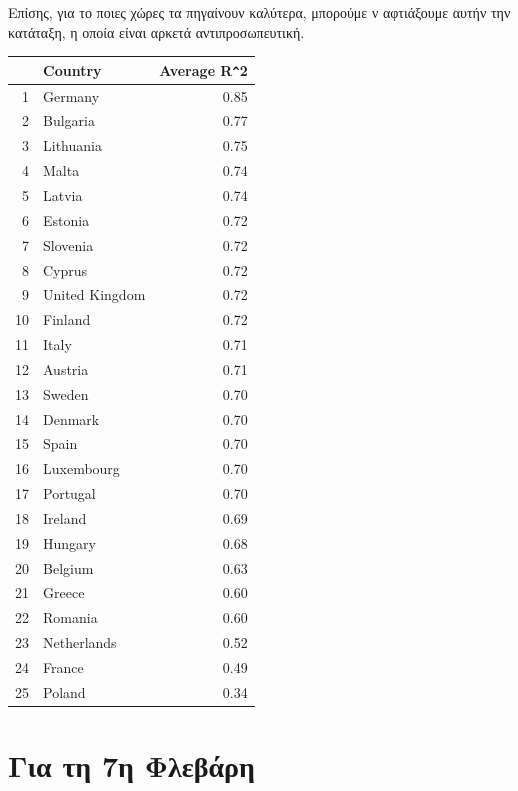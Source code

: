\documentclass[a4paper,twoside,10pt]{article}
\begin{document}
	Επίσης, για το ποιες χώρες τα πηγαίνουν καλύτερα, μπορούμε ν αφτιάξουμε αυτήν την κατάταξη, η οποία είναι αρκετά αντιπροσωπευτική.
	\begin{table}[H]
		\centering
		\begin{tabular}{rlr}
			\hline
			& Country & Average R\verb|^|2 \\
			\hline
			1 & Germany & 0.85 \\
			2 & Bulgaria & 0.77 \\
			3 & Lithuania & 0.75 \\
			4 & Malta & 0.74 \\
			5 & Latvia & 0.74 \\ 
			6 & Estonia & 0.72 \\
			7 & Slovenia & 0.72 \\
			8 & Cyprus & 0.72 \\
			9 & United Kingdom & 0.72 \\
			10 & Finland & 0.72 \\
			11 & Italy & 0.71 \\
			12 & Austria & 0.71 \\
			13 & Sweden & 0.70 \\ 
			14 & Denmark & 0.70 \\
			15 & Spain & 0.70 \\
			16 & Luxembourg & 0.70 \\
			17 & Portugal & 0.70 \\
			18 & Ireland & 0.69 \\
			19 & Hungary & 0.68 \\
			20 & Belgium & 0.63 \\
			21 & Greece & 0.60 \\
			22 & Romania & 0.60 \\
			23 & Netherlands & 0.52 \\
			24 & France & 0.49 \\ 
			25 & Poland & 0.34 \\
			\hline
		\end{tabular}
	\end{table}

	\newpage
	\section{Για τη 7η Φλεβάρη}
	
\end{document}
